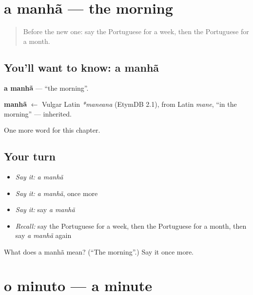 \section[a manhã]{a manhã — the morning}

\label{lesson:PT-C70-manha}



\begin{quote}
Before the new one: say the Portuguese for a week, then the Portuguese for a month.
\end{quote}

\subsection*{You'll want to know: a manhã}
\textbf{a manhã} — \textquotedblleft{}the morning\textquotedblright{}.

\begin{cousinweb}
\textbf{manhã} $\leftarrow$ Vulgar Latin \emph{*maneana} (EtymDB 2.1), from Latin \emph{mane}, \textquotedblleft{}in the morning\textquotedblright{} — inherited.
\end{cousinweb}

\begin{grammarlens}[title={What you've built}]
One more word for this chapter.
\end{grammarlens}

\subsection*{Your turn}
\begin{itemize}
\raggedright
  \item \emph{Say it:} \emph{a manhã}
  \item \emph{Say it:} \emph{a manhã}, once more
  \item \emph{Say it:} say \emph{a manhã}
  \item \emph{Recall:} say the Portuguese for a week, then the Portuguese for a month, then say \emph{a manhã} again
\end{itemize}

\begin{tcolorbox}[breakable,colback=teal!4,colframe=teal!35!black,title={Before you move on}]
What does a manhã mean? (\textquotedblleft{}The morning\textquotedblright{}.) Say it once more.
\end{tcolorbox}
\section[o minuto]{o minuto — a minute}

